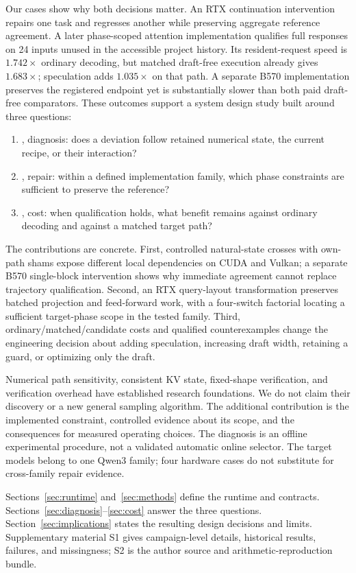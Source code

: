Our cases show why both decisions matter. An RTX continuation intervention repairs one task and regresses another while preserving aggregate reference agreement. A later phase-scoped attention implementation qualifies full responses on 24 inputs unused in the accessible project history. Its resident-request speed is $1.742\times$ ordinary decoding, but matched draft-free execution already gives $1.683\times$; speculation adds $1.035\times$ on that path. A separate B570 implementation preserves the registered endpoint yet is substantially slower than both paid draft-free comparators. These outcomes support a system design study built around three questions:
\begin{enumerate}
\item {}, diagnosis: does a deviation follow retained numerical state, the current recipe, or their interaction?
\item {}, repair: within a defined implementation family, which phase constraints are sufficient to preserve the reference?
\item {}, cost: when qualification holds, what benefit remains against ordinary decoding and against a matched target path?
\end{enumerate}

The contributions are concrete. First, controlled natural-state crosses with own-path shams expose different local dependencies on CUDA and Vulkan; a separate B570 single-block intervention shows why immediate agreement cannot replace trajectory qualification. Second, an RTX query-layout transformation preserves batched projection and feed-forward work, with a four-switch factorial locating a sufficient target-phase scope in the tested family. Third, ordinary/matched/candidate costs and qualified counterexamples change the engineering decision about adding speculation, increasing draft width, retaining a guard, or optimizing only the draft.

Numerical path sensitivity, consistent KV state, fixed-shape verification, and verification overhead have established research foundations. We do not claim their discovery or a new general sampling algorithm. The additional contribution is the implemented constraint, controlled evidence about its scope, and the consequences for measured operating choices. The diagnosis is an offline experimental procedure, not a validated automatic online selector. The target models belong to one Qwen3 family; four hardware cases do not substitute for cross-family repair evidence.

Sections~\ref{sec:runtime} and~\ref{sec:methods} define the runtime and contracts. Sections~\ref{sec:diagnosis}--\ref{sec:cost} answer the three questions. Section~\ref{sec:implications} states the resulting design decisions and limits. Supplementary material S1 gives campaign-level details, historical results, failures, and missingness; S2 is the author source and arithmetic-reproduction bundle.

